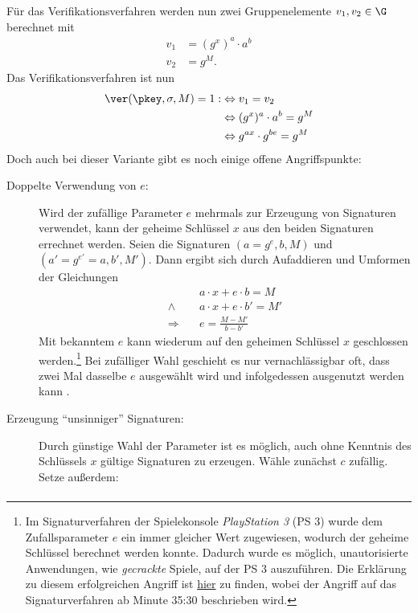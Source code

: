 Für das Verifikationsverfahren werden nun zwei Gruppenelemente $v_1,
v_2 \in \G$ berechnet mit
\begin{align*}
  v_1 &= (g^x)^a \cdot a^b\\
  v_2 &= g^M.
\end{align*}
Das Verifikationsverfahren ist nun
\begin{align*}
\ver(\pkey,\sigma,M) = 1 : & \Leftrightarrow v_1 = v_2 \\
 &\Leftrightarrow (g^x)^a \cdot a^b = g^M \\
 &\Leftrightarrow  g^{ax} \cdot g^{be} = g^M
\end{align*}
Doch auch bei dieser Variante gibt es noch einige offene Angriffspunkte:
\begin{description}
	\item[Doppelte Verwendung von $e$:]
	Wird der zufällige Parameter $e$ mehrmals zur Erzeugung von Signaturen verwendet, kann der geheime Schlüssel $x$ aus den beiden Signaturen errechnet werden. Seien die Signaturen $(a = g^e, b, M)$ und $(a' = g^{e'} = a, b', M')$. Dann ergibt sich durch Aufaddieren und Umformen
	der Gleichungen
	\begin{align*}
	&a \cdot x + e \cdot b = M\\
	\land \quad &a \cdot x + e \cdot b' = M'\\
	\Rightarrow \quad &e = \frac{M - M'}{b - b'}
	\end{align*}
	Mit bekanntem $e$ kann wiederum auf den geheimen Schlüssel $x$
        geschlossen werden.\footnote{Im Signaturverfahren der
          Spielekonsole \textit{PlayStation 3} (PS 3) wurde dem
          Zufallsparameter $e$ ein immer gleicher Wert zugewiesen,
          wodurch der geheime Schlüssel berechnet werden konnte. Dadurch
          wurde es möglich, unautorisierte Anwendungen, wie
          \textit{gecrackte} Spiele, auf der PS 3 auszuführen. Die
          Erklärung zu diesem erfolgreichen Angriff ist
          \href{https://www.youtube.com/watch?v=4loZGYqaZ7I}{hier} zu
          finden, wobei der Angriff auf das Signaturverfahren ab Minute
          35:30 beschrieben wird.} Bei zufälliger Wahl geschieht es nur
        vernachlässigbar oft, dass zwei Mal dasselbe $e$ ausgewählt wird
        und infolgedessen ausgenutzt werden kann .
	\item[Erzeugung "`unsinniger"' Signaturen:]
	Durch günstige Wahl der Parameter ist es möglich, auch ohne Kenntnis des Schlüssels $x$ gültige Signaturen zu erzeugen. Wähle zunächst $c$
	zufällig. Setze außerdem:
	\begin{align*}

\end{align*}
\end{description}
